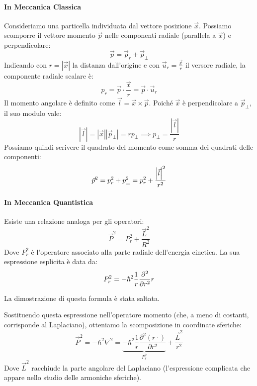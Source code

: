 \paragraph{In Meccanica Classica}
Consideriamo una particella individuata dal vettore posizione \( \vec{x} \). Possiamo scomporre il vettore momento \( \vec{p} \) nelle componenti radiale (parallela a \( \vec{x} \)) e perpendicolare:
\[
\vec{p} = \vec{p}_r + \vec{p}_\perp
\]
Indicando con \( r = |\vec{x}| \) la distanza dall'origine e con \( \vec{u}_r = \frac{\vec{x}}{r} \) il versore radiale, la componente radiale scalare è:
\[
p_r = \vec{p} \cdot \frac{\vec{x}}{r} = \vec{p} \cdot \vec{u}_r
\]
Il momento angolare è definito come \( \vec{l} = \vec{x} \times \vec{p} \). Poiché \( \vec{x} \) è perpendicolare a \( \vec{p}_\perp \), il suo modulo vale:
\[
|\vec{l}| = |\vec{x}| |\vec{p}_\perp| = r p_\perp \implies p_\perp = \frac{|\vec{l}|}{r}
\]
Possiamo quindi scrivere il quadrato del momento come somma dei quadrati delle componenti:
\[
\vec{p}^2 = p_r^2 + p_\perp^2 = p_r^2 + \frac{\abs{\vec{l}}^2}{r^2}
\]

\paragraph{In Meccanica Quantistica}
Esiste una relazione analoga per gli operatori:
\begin{equation}
    \vec{P}^2 = P_r^2 + \frac{\vec{L}^2}{R^2}
\end{equation}
Dove \( P_r^2 \) è l'operatore associato alla parte radiale dell'energia cinetica. La sua espressione esplicita è data da:
\begin{equation*}
    P_r^2 = -\hbar^2 \frac{1}{r} \pdv[2]{r} r
\end{equation*}
\begin{attention}
    La dimostrazione di questa formula è stata saltata.
\end{attention}

Sostituendo questa espressione nell'operatore momento (che, a meno di costanti, corrisponde al Laplaciano), otteniamo la scomposizione in coordinate sferiche:
\begin{equation}
    \vec{P}^2 = -\hbar^2 \nabla^2 = \underbrace{-\hbar^2 \frac{1}{r} \frac{\partial^2 (r \cdot)}{\partial r^2}}_{P_r^2} + \frac{\vec{L}^2}{r^2}
\end{equation}
Dove \( \vec{L}^2 \) racchiude la parte angolare del Laplaciano (l'espressione complicata che appare nello studio delle armoniche sferiche).

